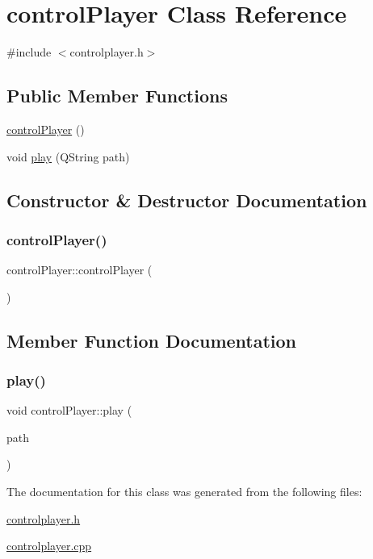 \hypertarget{classcontrol_player}{}\section{control\+Player Class Reference}
\label{classcontrol_player}


{\ttfamily \#include $<$controlplayer.\+h$>$}

\subsection*{Public Member Functions}
\begin{DoxyCompactItemize}
\item 
\mbox{\hyperlink{classcontrol_player_a0a856a9be1f79fb63a8472edce7a82bc}{control\+Player}} ()
\item 
void \mbox{\hyperlink{classcontrol_player_a70da3511c017fdedfc5a0d6ab53237d2}{play}} (Q\+String path)
\end{DoxyCompactItemize}


\subsection{Constructor \& Destructor Documentation}
\mbox{\label{classcontrol_player_a0a856a9be1f79fb63a8472edce7a82bc}} 
\subsubsection{\texorpdfstring{controlPlayer()}{controlPlayer()}}
{\footnotesize\ttfamily control\+Player\+::control\+Player (\begin{DoxyParamCaption}{ }\end{DoxyParamCaption})}



\subsection{Member Function Documentation}
\mbox{\label{classcontrol_player_a70da3511c017fdedfc5a0d6ab53237d2}} 
\subsubsection{\texorpdfstring{play()}{play()}}
{\footnotesize\ttfamily void control\+Player\+::play (\begin{DoxyParamCaption}\item[{Q\+String}]{path }\end{DoxyParamCaption})}



The documentation for this class was generated from the following files\+:\begin{DoxyCompactItemize}
\item 
\mbox{\hyperlink{controlplayer_8h}{controlplayer.\+h}}\item 
\mbox{\hyperlink{controlplayer_8cpp}{controlplayer.\+cpp}}\end{DoxyCompactItemize}
